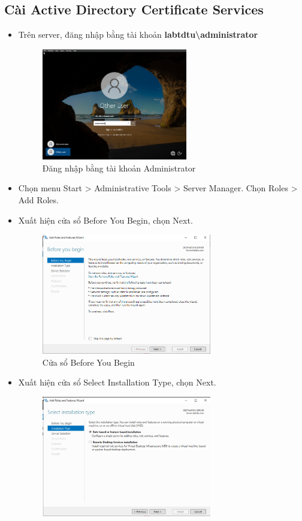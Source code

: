 \documentclass[13pt]{report}
\begin{document}
	\subsection{Cài Active Directory Certificate Services}
	\begin{itemize}
		\item Trên server, đăng nhập bằng tài khoản \textbf{labtdtu\textbackslash administrator}
		\begin{figure}[htp]
			\centering
			\includegraphics[width=0.6\textwidth]{image/Gui/ADCS/0.png}
			\caption{Đăng nhập bằng tài khoản Administrator}
		\end{figure}
		\item Chọn menu Start > Administrative Tools > Server Manager. Chọn Roles > Add Roles.
		\item Xuất hiện cửa sổ Before You Begin, chọn Next.
		\begin{figure}[htp]
			\centering
			\includegraphics[width=0.7\textwidth]{image/Gui/ADCS/2.png}
			\caption{Cửa sổ Before You Begin}
		\end{figure}
		\newpage
		\item Xuất hiện cửa sổ Select Installation Type, chọn Next.
		\begin{figure}[htp]
			\centering
			\includegraphics[width=0.7\textwidth]{image/Gui/ADCS/3.png}

\end{figure}
\end{itemize}
\end{document}
